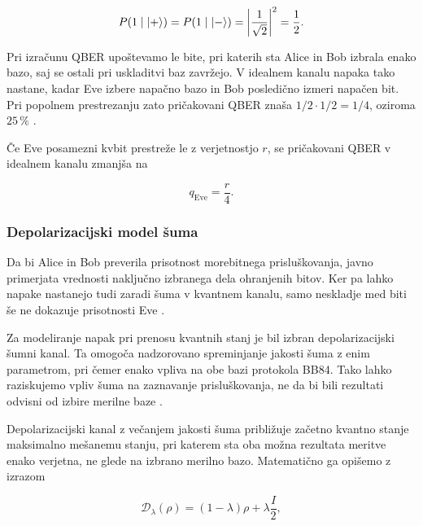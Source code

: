     \begin{equation}
        P(1 \mid \ket{+}) =
        P(1 \mid \ket{-}) =
        \left|\frac{1}{\sqrt{2}}\right|^2
        = \frac{1}{2}.
    \end{equation}

    Pri izračunu QBER upoštevamo le bite, pri katerih sta Alice in Bob izbrala enako bazo, saj se ostali
    pri uskladitvi baz zavržejo. V idealnem kanalu
    napaka tako nastane, kadar Eve izbere napačno bazo
    in Bob posledično izmeri napačen bit.
    Pri popolnem prestrezanju zato pričakovani QBER
    znaša $1/2 \cdot 1/2 = 1/4$, oziroma $25\,\%$
    \cite{g22:mina2020scalable,g22:lee2023detection}.

    Če Eve posamezni kvbit prestreže le z verjetnostjo
    $r$, se pričakovani QBER v idealnem kanalu zmanjša na

    \begin{equation}
        q_{\mathrm{Eve}} = \frac{r}{4}.
        \label{g22:eq:qber_eve}
    \end{equation}

\subsubsection{Depolarizacijski model šuma}
\label{g22:sec:depolarizacija}

    Da bi Alice in Bob preverila prisotnost morebitnega prisluškovanja, javno primerjata vrednosti naključno izbranega dela ohranjenih bitov. Ker pa lahko napake nastanejo tudi zaradi šuma v kvantnem kanalu, samo neskladje med biti še ne dokazuje prisotnosti Eve \cite{g22:lee2023detection,g22:fiorini2024estimating}.


    Za modeliranje napak pri prenosu kvantnih stanj je bil izbran depolarizacijski šumni kanal.
    Ta omogoča nadzorovano spreminjanje jakosti šuma z enim parametrom, pri čemer enako vpliva na obe bazi protokola BB84.
    Tako lahko raziskujemo vpliv šuma na zaznavanje prisluškovanja, ne da bi bili rezultati odvisni od izbire merilne baze \cite{g22:aer-depolarizing}.


    Depolarizacijski kanal z večanjem jakosti šuma približuje začetno kvantno stanje maksimalno mešanemu stanju, pri katerem sta oba možna rezultata meritve enako verjetna, ne glede na izbrano merilno bazo.
    Matematično ga opišemo z izrazom

    \begin{equation}
        \mathcal{D}_{\lambda}(\rho)
        = (1-\lambda)\rho+\lambda\frac{I}{2},
        \label{g22:eq:depolarizing}
    \end{equation}

